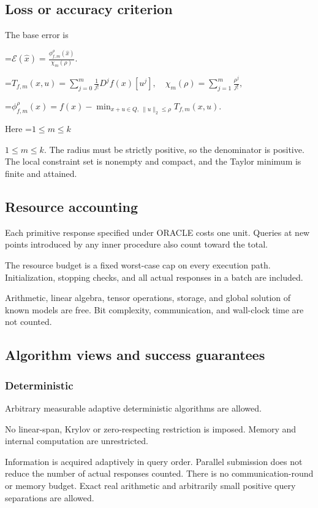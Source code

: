 \documentclass[10pt,a4paper]{article}
\newcommand{\AtlasMath}[1]{\par\begingroup\centering\setbox0=\hbox{$\displaystyle #1$}\ifdim\wd0>1.4\linewidth\typeout{ATLAS WIDE FORMULA: \the\wd0}\fi\ifdim\wd0>\linewidth\resizebox{\linewidth}{!}{\box0}\else\box0\fi\par\endgroup}
\newcommand{\AtlasInlineMath}[1]{\begingroup\setbox0=\hbox{$#1$}\ifdim\wd0>.4\linewidth\endgroup\AtlasMath{#1}\else\endgroup$#1$\fi}
\begin{document}
\subsection{Loss or accuracy criterion}
The base error is


\AtlasMath{\mathcal{E}(\widehat{x})=\frac{\phi_{f,m}^{\rho}(\widehat{x})}{\chi_m(\rho)}.}



\AtlasMath{T_{f,m}(x,u)=\sum_{j=0}^m\frac1{j!}D^jf(x)[u^j],\quad\chi_m(\rho)=\sum_{j=1}^m\frac{\rho^j}{j!},}



\AtlasMath{\phi_{f,m}^{\rho}(x)=f(x)-\min_{x+u\in Q,\ \|u\|_2\le\rho}T_{f,m}(x,u).}


Here \AtlasInlineMath{1\le m\le k}. The radius must be strictly positive, so the denominator is positive. The local constraint set is nonempty and compact, and the Taylor minimum is finite and attained.

\subsection{Resource accounting}
Each primitive response specified under ORACLE costs one unit. Queries at new points introduced by any inner procedure also count toward the total.

The resource budget is a fixed worst-case cap on every execution path. Initialization, stopping checks, and all actual responses in a batch are included.

Arithmetic, linear algebra, tensor operations, storage, and global solution of known models are free. Bit complexity, communication, and wall-clock time are not counted.

\subsection{Algorithm views and success guarantees}
\subsubsection{Deterministic}
Arbitrary measurable adaptive deterministic algorithms are allowed.

No linear-span, Krylov or zero-respecting restriction is imposed. Memory and internal computation are unrestricted.

Information is acquired adaptively in query order. Parallel submission does not reduce the number of actual responses counted. There is no communication-round or memory budget. Exact real arithmetic and arbitrarily small positive query separations are allowed.
\end{document}
